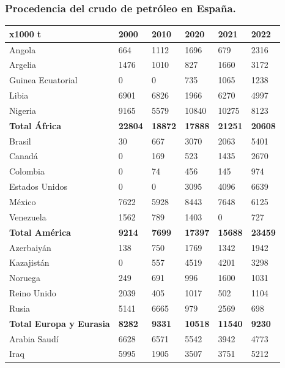 		\subsubsection{Procedencia del crudo de petróleo en España.}
			\begin{table}[H]
				\begin{tabular}{llllll}
					\textbf{x1000 t}	&	\textbf{2000}	&	\textbf{2010}	&	\textbf{2020}	&	\textbf{2021}	&	\textbf{2022}	\\
					\hline
					Angola	&	664	&	1112	&	1696	&	679	&	2316	\\
					Argelia	&	1476	&	1010	&	827	&	1660	&	3172	\\
					Guinea Ecuatorial	&	0	&	0	&	735	&	1065	&	1238	\\
					Libia	&	6901	&	6826	&	1966	&	6270	&	4997	\\
					Nigeria	&	9165	&	5579	&	10840	&	10275	&	8123	\\
					\textbf{Total África}	&	\textbf{22804}	&	\textbf{18872}	&	\textbf{17888}	&	\textbf{21251}	&	\textbf{20608}	\\
					\hline
					Brasil	&	30	&	667	&	3070	&	2063	&	5401	\\
					Canadá	&	0	&	169	&	523	&	1435	&	2670	\\
					Colombia	&	0	&	74	&	456	&	145	&	974	\\
					Estados Unidos	&	0	&	0	&	3095	&	4096	&	6639	\\
					México	&	7622	&	5928	&	8443	&	7648	&	6125	\\
					Venezuela	&	1562	&	789	&	1403	&	0	&	727	\\
					\textbf{Total América}	&	\textbf{9214}	&	\textbf{7699}	&	\textbf{17397}	&	\textbf{15688}	&	\textbf{23459}	\\
					\hline
					Azerbaiyán	&	138	&	750	&	1769	&	1342	&	1942	\\
					Kazajistán	&	0	&	557	&	4519	&	4201	&	3298	\\
					Noruega	&	249	&	691	&	996	&	1600	&	1031	\\
					Reino Unido	&	2039	&	405	&	1017	&	502	&	1104	\\
					Rusia	&	5141	&	6665	&	979	&	2569	&	698	\\
					\textbf{Total Europa y Eurasia}	&	\textbf{8282}	&	\textbf{9331}	&	\textbf{10518}	&	\textbf{11540}	&	\textbf{9230}	\\
					\hline
					Arabia Saudí	&	6628	&	6571	&	5542	&	3942	&	4773	\\
					Iraq	&	5995	&	1905	&	3507	&	3751	&	5212	\\

\end{tabular}
\end{table}
